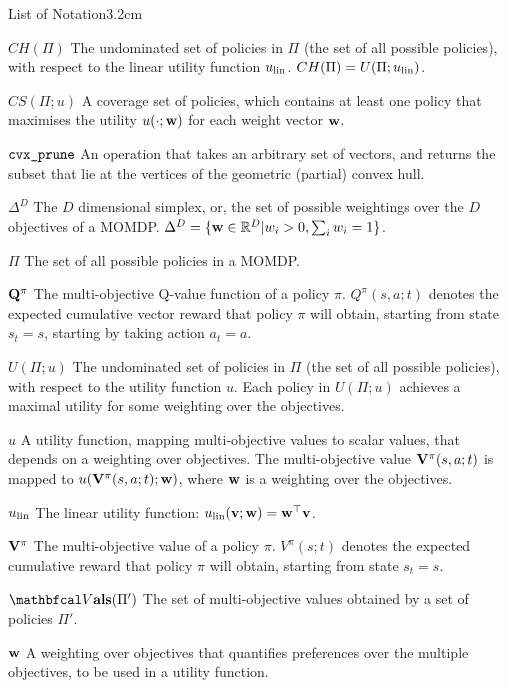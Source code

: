 \begin{mclistof}{List of Notation}{3.2cm}
    \item[$CH(\Pi)$] 
        The undominated set of policies in $\Pi$ (the set of all possible policies), with respect to the linear utility function $u_{{\textnormal{lin}}}$. $CH(\Pi)=U(\Pi;u_{{\textnormal{lin}}})$.
    \item[$CS(\Pi;u)$] 
        A coverage set of policies, which contains at least one policy that maximises the utility $u(\cdot;\mathbf{w})$ for each weight vector $\mathbf{w}$.
    \item[${\textnormal{\texttt{cvx\_prune}}}$] 
        An operation that takes an arbitrary set of vectors, and returns the subset that lie at the vertices of the geometric (partial) convex hull. 
    \item[$\Delta^D$] 
        The $D$ dimensional simplex, or, the set of possible weightings over the $D$ objectives of a MOMDP. $\Delta^D = \{\mathbf{w}\in\mathbb{R}^D|w_i > 0, \sum_i w_i = 1\}$.
    \item[$\Pi$] 
        The set of all possible policies in a MOMDP.
    \item[$\mathbf{Q}^{\pi}$]
        The multi-objective Q-value function of a policy $\pi$. $Q^{\pi}(s,a;t)$ denotes the expected cumulative vector reward that policy $\pi$ will obtain, starting from state $s_t=s$, starting by taking action $a_t=a$.
    \item[$U(\Pi;u)$] 
        The undominated set of policies in $\Pi$ (the set of all possible policies), with respect to the utility function $u$. Each policy in $U(\Pi;u)$ achieves a maximal utility for some weighting over the objectives.
    \item[$u$] 
        A utility function, mapping multi-objective values to scalar values, that depends on a weighting over objectives. The multi-objective value $\mathbf{V}^{\pi}(s,a;t)$ is mapped to $u(\mathbf{V}^{\pi}(s,a;t);\mathbf{w})$, where $\mathbf{w}$ is a weighting over the objectives.
    \item[$u_{{\textnormal{lin}}}$]
        The linear utility function: $u_{{\textnormal{lin}}}(\mathbf{v};\mathbf{w}) = \mathbf{w}^\top \mathbf{v}$.
    \item[$\mathbf{V}^{\pi}$]
        The multi-objective value of a policy $\pi$. $V^{\pi}(s;t)$ denotes the expected cumulative reward that policy $\pi$ will obtain, starting from state $s_t=s$.
    \item[$\valset(\Pi')$] 
        The set of multi-objective values obtained by a set of policies $\Pi'$.
    \item[$\mathbf{w}$] 
        A weighting over objectives that quantifies preferences over the multiple objectives, to be used in a utility function.

\end{mclistof}
